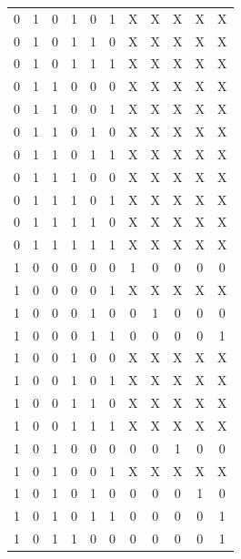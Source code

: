\documentclass{article}
\begin{document}
\begin{center}
\begin{tabular}{c|c|c|c|c|c|c|c|c|c|c}
        0  &  1  &  0  &  1  &  0  &  1  &  X  &  X  &  X  &  X  &  X \\
        0  &  1  &  0  &  1  &  1  &  0  &  X  &  X  &  X  &  X  &  X \\
        0  &  1  &  0  &  1  &  1  &  1  &  X  &  X  &  X  &  X  &  X \\
        0  &  1  &  1  &  0  &  0  &  0  &  X  &  X  &  X  &  X  &  X \\
        0  &  1  &  1  &  0  &  0  &  1  &  X  &  X  &  X  &  X  &  X \\
        0  &  1  &  1  &  0  &  1  &  0  &  X  &  X  &  X  &  X  &  X \\
        0  &  1  &  1  &  0  &  1  &  1  &  X  &  X  &  X  &  X  &  X \\
        0  &  1  &  1  &  1  &  0  &  0  &  X  &  X  &  X  &  X  &  X \\
        0  &  1  &  1  &  1  &  0  &  1  &  X  &  X  &  X  &  X  &  X \\
        0  &  1  &  1  &  1  &  1  &  0  &  X  &  X  &  X  &  X  &  X \\
        0  &  1  &  1  &  1  &  1  &  1  &  X  &  X  &  X  &  X  &  X \\
        1  &  0  &  0  &  0  &  0  &  0  &  1  &  0  &  0  &  0  &  0 \\
        1  &  0  &  0  &  0  &  0  &  1  &  X  &  X  &  X  &  X  &  X \\
        1  &  0  &  0  &  0  &  1  &  0  &  0  &  1  &  0  &  0  &  0 \\
        1  &  0  &  0  &  0  &  1  &  1  &  0  &  0  &  0  &  0  &  1 \\
        1  &  0  &  0  &  1  &  0  &  0  &  X  &  X  &  X  &  X  &  X \\
        1  &  0  &  0  &  1  &  0  &  1  &  X  &  X  &  X  &  X  &  X \\
        1  &  0  &  0  &  1  &  1  &  0  &  X  &  X  &  X  &  X  &  X \\
        1  &  0  &  0  &  1  &  1  &  1  &  X  &  X  &  X  &  X  &  X \\
        1  &  0  &  1  &  0  &  0  &  0  &  0  &  0  &  1  &  0  &  0 \\
        1  &  0  &  1  &  0  &  0  &  1  &  X  &  X  &  X  &  X  &  X \\
        1  &  0  &  1  &  0  &  1  &  0  &  0  &  0  &  0  &  1  &  0 \\
        1  &  0  &  1  &  0  &  1  &  1  &  0  &  0  &  0  &  0  &  1 \\
        1  &  0  &  1  &  1  &  0  &  0  &  0  &  0  &  0  &  0  &  1 \\

\end{tabular}
\end{center}
\end{document}
